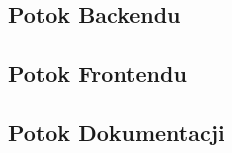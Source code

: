 \subsection{Potok Backendu}
\label{subsec:potok-backendu}

\subsection{Potok Frontendu}
\label{subsec:potok-frontendu}

\subsection{Potok Dokumentacji}
\label{subsec:potok-dokumentacji}
